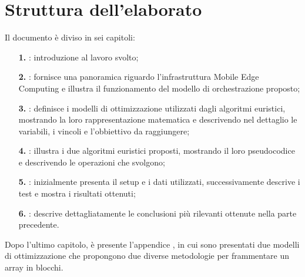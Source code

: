 %
%
\section{Struttura dell'elaborato}
\label{sec:organizzazione-elaborato}

Il documento è diviso in sei capitoli:
\begin{itemize}
    \item[\textbf{1.}] \textbf{}: introduzione al lavoro svolto;
    \item[\textbf{2.}] \textbf{}: fornisce una panoramica riguardo l'infrastruttura Mobile Edge Computing e illustra il funzionamento del modello di orchestrazione proposto;
    \item[\textbf{3.}] \textbf{}: definisce i modelli di ottimizzazione utilizzati dagli algoritmi euristici, mostrando la loro rappresentazione matematica e descrivendo nel dettaglio le variabili, i vincoli e l'obbiettivo da raggiungere;
    \item[\textbf{4.}] \textbf{}: illustra i due algoritmi euristici proposti, mostrando il loro pseudocodice e descrivendo le operazioni che svolgono;
    \item[\textbf{5.}] \textbf{}: inizialmente presenta il setup e i dati utilizzati, successivamente descrive i test e mostra i risultati ottenuti;
    \item[\textbf{6.}] \textbf{}: descrive dettagliatamente le conclusioni più rilevanti ottenute nella parte precedente.
\end{itemize}
Dopo l'ultimo capitolo, è presente l'appendice \textbf{}, in cui sono presentati due modelli di ottimizzazione che propongono due diverse metodologie per frammentare un array in blocchi.

